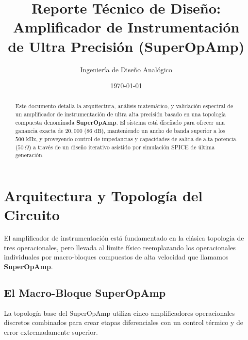 \documentclass[11pt, a4paper]{article}
\title{\textbf{Reporte Técnico de Diseño: Amplificador de Instrumentación de Ultra Precisión (SuperOpAmp)}}
\author{Ingeniería de Diseño Analógico}
\date{\today}
\begin{document}
\maketitle

\begin{abstract}
Este documento detalla la arquitectura, análisis matemático, y validación espectral de un amplificador de instrumentación de ultra alta precisión basado en una topología compuesta denominada \textbf{SuperOpAmp}. El sistema está diseñado para ofrecer una ganancia exacta de $20,000$ ($86\text{ dB}$), manteniendo un ancho de banda superior a los $500\text{ kHz}$, y proveyendo control de impedancias y capacidades de salida de alta potencia ($50\,\Omega$) a través de un diseño iterativo asistido por simulación SPICE de última generación.
\end{abstract}

\tableofcontents
\newpage

\section{Arquitectura y Topología del Circuito}

El amplificador de instrumentación está fundamentado en la clásica topología de tres operacionales, pero llevada al límite físico reemplazando los operacionales individuales por macro-bloques compuestos de alta velocidad que llamamos \textbf{SuperOpAmp}.

\subsection{El Macro-Bloque SuperOpAmp}

La topología base del SuperOpAmp utiliza cinco amplificadores operacionales discretos combinados para crear etapas diferenciales con un control térmico y de error extremadamente superior.
\end{document}
